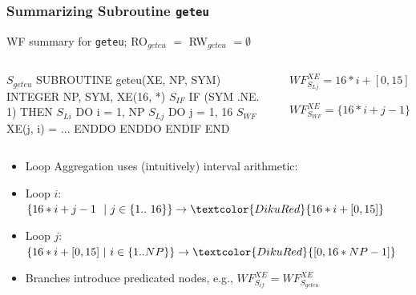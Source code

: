 \documentclass{beamer}
\renewcommand{\emph}[1]{\textcolor{structure}{#1}}
\newcommand{\emp}[1]{\textcolor{DikuRed}{ #1}}
\newcommand{\mymath}[1]{$ #1 $}
\newcommand{\myindx}[1]{_{#1}}
\newcommand{\myindu}[1]{^{#1}}
\begin{document}
\begin{frame}[fragile,t]
  \frametitle{Summarizing Subroutine {\tt geteu}}

\begin{block}{WF summary for {\tt geteu}; RO$_{geteu}$ $=$ RW$_{geteu}$ $= \emptyset$ } \vspace{-1ex}
\begin{columns} 
\begin{colorcode}[fontsize=\scriptsize]
\mymath{S\myindx{geteu}}  SUBROUTINE geteu(XE, NP, SYM)
         INTEGER NP, SYM, XE(16, *)  
\mymath{S\myindx{IF}}       \emph{IF (SYM .NE. 1) THEN}
\mymath{S\myindx{Li}}         \emp{DO i = 1, NP}
\mymath{S\myindx{Lj}}           \emp{DO j = 1, 16}
\mymath{S\myindx{WF}}             \alert{XE(j, i)} = ...
             \emp{ENDDO} 
           \emp{ENDDO}
         \emph{ENDIF}
       END
\end{colorcode}
\begin{colorcode}[fontsize=\scriptsize]






\emp{\mymath{WF\myindu{XE}\myindx{S\myindx{Lj}} = 16*i + [0,15]}}

\alert{\mymath{WF\myindu{XE}\myindx{S\myindx{WF}} = \{16*i+j-1\}}}
\end{colorcode}
\end{columns}
\end{block}


\begin{itemize}
    \item Loop Aggregation uses (intuitively) interval arithmetic: \smallskip
    \item Loop $i$: $\{16*i + j - 1 \mbox{ }\mbox{ }|\mbox{ } j \in \{1..\mbox{ }16\}\} \rightarrow \emp{16*i + [0,15]}$ \smallskip
    \item Loop $j$: $\{16*i + [0,15] \mbox{ }|\mbox{ } i \in \{1..NP\}\} \rightarrow \emp{[0, 16*NP-1]}$  \smallskip
    \item Branches introduce predicated nodes, e.g., \emph{$WF^{XE}_{S_{if}} = WF^{XE}_{S_{geteu}}$} 
\end{itemize}
\end{frame}


\end{document}
